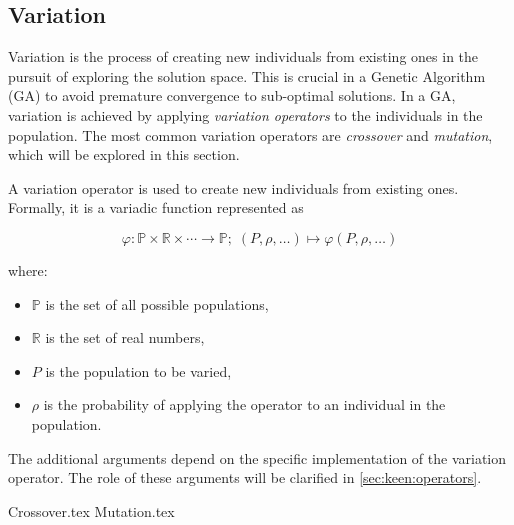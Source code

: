 \subsection{Variation}
\label{sec:genetic_algorithms:variation}
  Variation is the process of creating new individuals from existing ones in the pursuit of 
  exploring the solution space.
  This is crucial in a Genetic Algorithm (GA) to avoid premature convergence to sub-optimal
  solutions.
  In a GA, variation is achieved by applying \emph{variation operators} to the individuals in the 
  population.
  The most common variation operators are \emph{crossover} and \emph{mutation}, which will be 
  explored in this section.

  \begin{Definition}
    \label{def:variation_operator}
    A variation operator is used to create new individuals from existing ones.
    Formally, it is a variadic function represented as 
    
    \[
      \varphi : \mathbb{P} \times \mathbb{R} \times \cdots \to \mathbb{P};\; 
      (P, \rho, \dots) \mapsto \varphi(P, \rho, \dots)
    \]
    
    where:

    \begin{itemize}
      \item \(\mathbb{P}\) is the set of all possible populations,
      \item \(\mathbb{R}\) is the set of real numbers,
      \item \(P\) is the population to be varied,
      \item \(\rho\) is the probability of applying the operator to an individual in the population.
    \end{itemize}

    The additional arguments depend on the specific implementation of the variation operator.
    The role of these arguments will be clarified in \vref{sec:keen:operators}.
  \end{Definition}

  {Crossover.tex}
  {Mutation.tex}
